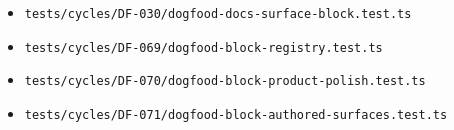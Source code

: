 \begin{itemize}
\tightlist
\item
  \texttt{t\allowbreak{}e\allowbreak{}s\allowbreak{}t\allowbreak{}s\allowbreak{}/\allowbreak{}c\allowbreak{}y\allowbreak{}c\allowbreak{}l\allowbreak{}e\allowbreak{}s\allowbreak{}/\allowbreak{}D\allowbreak{}F\allowbreak{}-\allowbreak{}0\allowbreak{}3\allowbreak{}0\allowbreak{}/\allowbreak{}d\allowbreak{}o\allowbreak{}g\allowbreak{}f\allowbreak{}o\allowbreak{}o\allowbreak{}d\allowbreak{}-\allowbreak{}d\allowbreak{}o\allowbreak{}c\allowbreak{}s\allowbreak{}-\allowbreak{}s\allowbreak{}u\allowbreak{}r\allowbreak{}f\allowbreak{}a\allowbreak{}c\allowbreak{}e\allowbreak{}-\allowbreak{}b\allowbreak{}l\allowbreak{}o\allowbreak{}c\allowbreak{}k\allowbreak{}.\allowbreak{}t\allowbreak{}e\allowbreak{}s\allowbreak{}t\allowbreak{}.\allowbreak{}t\allowbreak{}s}
\item
  \texttt{t\allowbreak{}e\allowbreak{}s\allowbreak{}t\allowbreak{}s\allowbreak{}/\allowbreak{}c\allowbreak{}y\allowbreak{}c\allowbreak{}l\allowbreak{}e\allowbreak{}s\allowbreak{}/\allowbreak{}D\allowbreak{}F\allowbreak{}-\allowbreak{}0\allowbreak{}6\allowbreak{}9\allowbreak{}/\allowbreak{}d\allowbreak{}o\allowbreak{}g\allowbreak{}f\allowbreak{}o\allowbreak{}o\allowbreak{}d\allowbreak{}-\allowbreak{}b\allowbreak{}l\allowbreak{}o\allowbreak{}c\allowbreak{}k\allowbreak{}-\allowbreak{}r\allowbreak{}e\allowbreak{}g\allowbreak{}i\allowbreak{}s\allowbreak{}t\allowbreak{}r\allowbreak{}y\allowbreak{}.\allowbreak{}t\allowbreak{}e\allowbreak{}s\allowbreak{}t\allowbreak{}.\allowbreak{}t\allowbreak{}s}
\item
  \texttt{t\allowbreak{}e\allowbreak{}s\allowbreak{}t\allowbreak{}s\allowbreak{}/\allowbreak{}c\allowbreak{}y\allowbreak{}c\allowbreak{}l\allowbreak{}e\allowbreak{}s\allowbreak{}/\allowbreak{}D\allowbreak{}F\allowbreak{}-\allowbreak{}0\allowbreak{}7\allowbreak{}0\allowbreak{}/\allowbreak{}d\allowbreak{}o\allowbreak{}g\allowbreak{}f\allowbreak{}o\allowbreak{}o\allowbreak{}d\allowbreak{}-\allowbreak{}b\allowbreak{}l\allowbreak{}o\allowbreak{}c\allowbreak{}k\allowbreak{}-\allowbreak{}p\allowbreak{}r\allowbreak{}o\allowbreak{}d\allowbreak{}u\allowbreak{}c\allowbreak{}t\allowbreak{}-\allowbreak{}p\allowbreak{}o\allowbreak{}l\allowbreak{}i\allowbreak{}s\allowbreak{}h\allowbreak{}.\allowbreak{}t\allowbreak{}e\allowbreak{}s\allowbreak{}t\allowbreak{}.\allowbreak{}t\allowbreak{}s}
\item
  \texttt{t\allowbreak{}e\allowbreak{}s\allowbreak{}t\allowbreak{}s\allowbreak{}/\allowbreak{}c\allowbreak{}y\allowbreak{}c\allowbreak{}l\allowbreak{}e\allowbreak{}s\allowbreak{}/\allowbreak{}D\allowbreak{}F\allowbreak{}-\allowbreak{}0\allowbreak{}7\allowbreak{}1\allowbreak{}/\allowbreak{}d\allowbreak{}o\allowbreak{}g\allowbreak{}f\allowbreak{}o\allowbreak{}o\allowbreak{}d\allowbreak{}-\allowbreak{}b\allowbreak{}l\allowbreak{}o\allowbreak{}c\allowbreak{}k\allowbreak{}-\allowbreak{}a\allowbreak{}u\allowbreak{}t\allowbreak{}h\allowbreak{}o\allowbreak{}r\allowbreak{}e\allowbreak{}d\allowbreak{}-\allowbreak{}s\allowbreak{}u\allowbreak{}r\allowbreak{}f\allowbreak{}a\allowbreak{}c\allowbreak{}e\allowbreak{}s\allowbreak{}.\allowbreak{}t\allowbreak{}e\allowbreak{}s\allowbreak{}t\allowbreak{}.\allowbreak{}t\allowbreak{}s}

\end{itemize}
